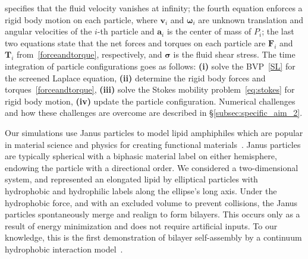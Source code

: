 specifies that the fluid velocity vanishes at infinity; the fourth
equation enforces a rigid body motion on each particle, where
$\mathbf{v}_i$ and $\boldsymbol{\omega}_i$ are unknown translation and
angular velocities of the $i$-th particle and $\mathbf{a}_i$ is the
center of mass of $P_i$; the last two equations state that the net
forces and torques on each particle are $\mathbf{F}_i$ and
$\mathbf{T}_i$ from~\eqref{forceandtorque}, respectively, and
$\boldsymbol{\sigma}$ is the fluid shear stress. The time integration of
particle configurations goes as follows: \textbf{(i)} solve the
BVP~\eqref{SL} for the screened Laplace equation, \textbf{(ii)}
determine the rigid body forces and torques~\eqref{forceandtorque},
\textbf{(iii)} solve the Stokes mobility problem~\eqref{eq:stokes} for
rigid body motion, \textbf{(iv)} update the particle configuration.
Numerical challenges and how these challenges are overcome are described
in \S\ref{subsec:specific_aim_2}.


Our simulations use Janus particles to model lipid amphiphiles which are
popular in material science and physics for creating functional
materials~\cite{Lee2014, Lee2013}. Janus particles are typically
spherical with a biphasic material label on either hemisphere, endowing
the particle with a directional order. We considered a two-dimensional
system, and represented an elongated lipid by elliptical particles with
hydrophobic and hydrophilic labels along the ellipse's long axis. Under
the hydrophobic force, and with an excluded volume to prevent
collisions, the Janus particles spontaneously merge and realign to form
bilayers. This occurs only as a result of energy minimization and does
not require artificial inputs. To our knowledge, this is the first
demonstration of bilayer self-assembly by a continuum hydrophobic
interaction model~\cite{Noguchi2001, Farago2003, Brannigan2006,
Brooks2009, Wang2013}.


